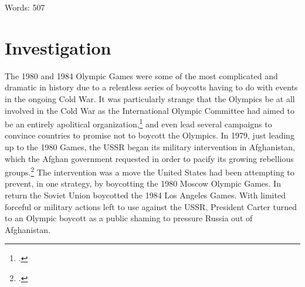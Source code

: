 \documentclass[12pt,letterpaper]{article}
\begin{document}
Words: 507

\newpage
\section{Investigation}

The 1980 and 1984 Olympic Games were some of the most complicated and dramatic in history due to a relentless series of boycotts having to do with events in the ongoing Cold War. It was particularly strange that the Olympics be at all involved in the Cold War as the International Olympic Committee had aimed to be an entirely apolitical organization,\footcite[3]{keys_political_2017} and even lead several campaigns to convince countries to promise not to boycott the Olympics. In 1979, just leading up to the 1980 Games, the USSR began its military intervention in Afghanistan, which the Afghan government requested in order to pacify its growing rebellious groups.\footcite[559]{guttmann_cold_1988} The intervention was a move the United States had been attempting to prevent, in one strategy, by boycotting the 1980 Moscow Olympic Games. In return the Soviet Union boycotted the 1984 Los Angeles Games. With limited forceful or military actions left to use against the USSR, President Carter turned to an Olympic boycott as a public shaming to pressure Russia out of Afghanistan. 
\end{document}
